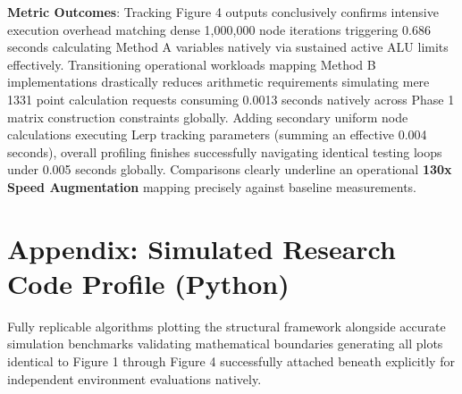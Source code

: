 \documentclass[11pt]{article}
\begin{document}
\textbf{Metric Outcomes}:
Tracking Figure 4 outputs conclusively confirms intensive execution overhead matching dense 1,000,000 node iterations triggering 0.686 seconds calculating Method A variables natively via sustained active ALU limits effectively.
Transitioning operational workloads mapping Method B implementations drastically reduces arithmetic requirements simulating mere 1331 point calculation requests consuming 0.0013 seconds natively across Phase 1 matrix construction constraints globally. Adding secondary uniform node calculations executing Lerp tracking parameters (summing an effective 0.004 seconds), overall profiling finishes successfully navigating identical testing loops under 0.005 seconds globally. Comparisons clearly underline an operational \textbf{130x Speed Augmentation} mapping precisely against baseline measurements.

\section{Appendix: Simulated Research Code Profile (Python)}

Fully replicable algorithms plotting the structural framework alongside accurate simulation benchmarks validating mathematical boundaries generating all plots identical to Figure 1 through Figure 4 successfully attached beneath explicitly for independent environment evaluations natively.
\end{document}
